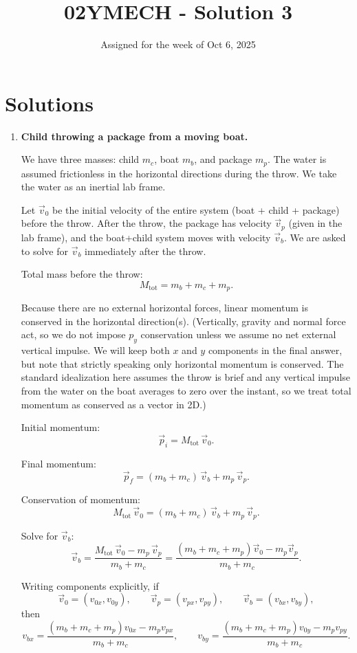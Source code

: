 \documentclass[12pt]{article}
\title{02YMECH - Solution 3}
\date{Assigned for the week of Oct 6, 2025}
\author{}
\begin{document}
\maketitle

\section*{Solutions}

\begin{enumerate}

\item \textbf{Child throwing a package from a moving boat.}

We have three masses: child $m_c$, boat $m_b$, and package $m_p$. The water is assumed frictionless in the horizontal directions during the throw. We take the water as an inertial lab frame.

Let $\vec{v}_0$ be the initial velocity of the entire system (boat + child + package) before the throw. After the throw, the package has velocity $\vec{v}_p$ (given in the lab frame), and the boat+child system moves with velocity $\vec{v}_b$. We are asked to solve for $\vec{v}_b$ immediately after the throw.

Total mass before the throw:
\[
M_{\text{tot}} = m_b + m_c + m_p.
\]

Because there are no external horizontal forces, linear momentum is conserved in the horizontal direction(s). (Vertically, gravity and normal force act, so we do not impose $p_y$ conservation unless we assume no net external vertical impulse. We will keep both $x$ and $y$ components in the final answer, but note that strictly speaking only horizontal momentum is conserved. The standard idealization here assumes the throw is brief and any vertical impulse from the water on the boat averages to zero over the instant, so we treat total momentum as conserved as a vector in 2D.)

Initial momentum:
\[
\vec{p}_i = M_{\text{tot}} \, \vec{v}_0.
\]

Final momentum:
\[
\vec{p}_f = (m_b + m_c)\, \vec{v}_b + m_p \, \vec{v}_p.
\]

Conservation of momentum:
\[
M_{\text{tot}} \, \vec{v}_0 = (m_b + m_c)\, \vec{v}_b + m_p \, \vec{v}_p.
\]

Solve for $\vec{v}_b$:
\[
\vec{v}_b
= \frac{M_{\text{tot}} \, \vec{v}_0 - m_p \, \vec{v}_p}{m_b + m_c}
= \frac{(m_b + m_c + m_p)\vec{v}_0 - m_p \vec{v}_p}{m_b + m_c}.
\]

Writing components explicitly, if
\[
\vec{v}_0 = (v_{0x}, v_{0y}), 
\qquad
\vec{v}_p = (v_{px}, v_{py}),
\qquad
\vec{v}_b = (v_{bx}, v_{by}),
\]
then
\[
v_{bx}
= \frac{(m_b + m_c + m_p) v_{0x} - m_p v_{px}}{m_b + m_c},
\qquad
v_{by}
= \frac{(m_b + m_c + m_p) v_{0y} - m_p v_{py}}{m_b + m_c}.
\]


\end{enumerate}
\end{document}
